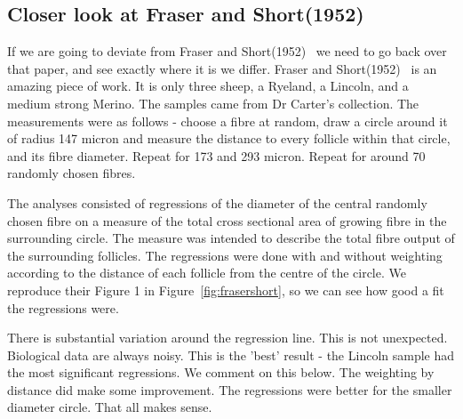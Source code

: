 \documentclass[titlepage]{article}  %
\begin{document}
\subsection{Closer look at Fraser and Short(1952)~\cite{fras:52}}
If we are going to deviate from Fraser and Short(1952)~\cite{fras:52} we need to go back over that paper, and see exactly where it is we differ. Fraser and Short(1952)~\cite{fras:52} is an amazing piece of work. It is only three sheep, a Ryeland, a Lincoln, and a medium strong Merino. The samples came from Dr Carter's collection. The measurements were as follows - choose a fibre at random, draw a circle around it of radius 147 micron and measure the distance to every follicle within that circle, and its fibre diameter. Repeat for 173 and 293 micron. Repeat for around 70 randomly chosen fibres.

The analyses consisted of regressions of the diameter of the central randomly chosen fibre on a measure of the total cross sectional area of growing fibre in the surrounding circle. The measure was intended to describe the total fibre output of the surrounding follicles.  The regressions were done with and without weighting according to the distance of each follicle from the centre of the circle. We reproduce their Figure 1  in Figure~\ref{fig:frasershort}, so we can see how good a fit the regressions were.

There is substantial variation around the regression line. This is not unexpected. Biological data are always noisy. This is the 'best' result - the Lincoln sample had the most significant regressions. We comment on this below. The weighting by distance did make some improvement.  The regressions were better for the smaller diameter circle. That all makes sense.
\end{document}
